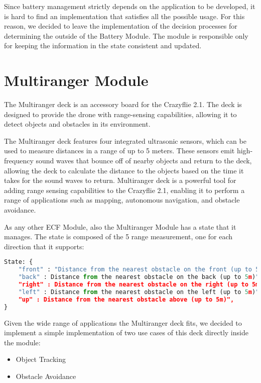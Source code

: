 Since battery management strictly depends on the application to be developed, it is hard to find an implementation that satisfies all the possible usage.
For this reason, we decided to leave the implementation of the decision processes for determining the outside of the Battery Module. 
The module is responsible only for keeping the information in the state consistent and updated.

\section{Multiranger Module}\label{sec:module_multiranger}

The Multiranger deck is an accessory board for the Crazyflie 2.1. 
The deck is designed to provide the drone with range-sensing capabilities, allowing it to detect objects and obstacles in its environment.

The Multiranger deck features four integrated ultrasonic sensors, which can be used to measure distances in a range of up to 5 meters. 
These sensors emit high-frequency sound waves that bounce off of nearby objects and return to the deck, allowing the deck to calculate the distance to the objects based on the time it takes for the sound waves to return.
Multiranger deck is a powerful tool for adding range sensing capabilities to the Crazyflie 2.1, enabling it to perform a range of applications such as mapping, autonomous navigation, and obstacle avoidance.

As any other ECF Module, also the Multiranger Module has a state that it manages. The state is composed of the 5 range measurement, one for each direction that it supports:
\begin{lstlisting}[language=Python]
State: {
    "front" : "Distance from the nearest obstacle on the front (up to 5m)",
    "back" : Distance from the nearest obstacle on the back (up to 5m)",
    "right" : Distance from the nearest obstacle on the right (up to 5m)",
    "left" : Distance from the nearest obstacle on the left (up to 5m)",
    "up" : Distance from the nearest obstacle above (up to 5m)",
}
\end{lstlisting}

Given the wide range of applications the Multiranger deck fits, we decided to implement a simple implementation of two use cases of this deck directly inside the module:
\begin{itemize}
    \item Object Tracking 
    \item Obstacle Avoidance
\end{itemize}


